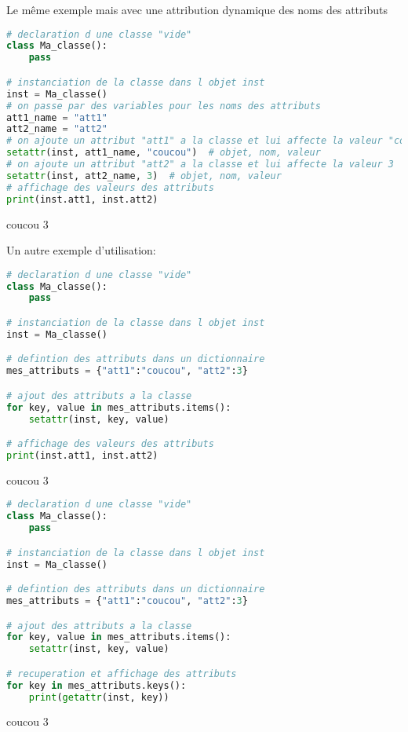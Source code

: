 Le même exemple mais avec une attribution dynamique des noms des attributs
\begin{lstlisting}[language=Python]
# declaration d une classe "vide"
class Ma_classe():
    pass

# instanciation de la classe dans l objet inst
inst = Ma_classe()
# on passe par des variables pour les noms des attributs
att1_name = "att1"
att2_name = "att2"
# on ajoute un attribut "att1" a la classe et lui affecte la valeur "coucou"
setattr(inst, att1_name, "coucou")  # objet, nom, valeur
# on ajoute un attribut "att2" a la classe et lui affecte la valeur 3
setattr(inst, att2_name, 3)  # objet, nom, valeur
# affichage des valeurs des attributs
print(inst.att1, inst.att2)
\end{lstlisting}
\begin{terminal}
coucou 3
\end{terminal}

Un autre exemple d'utilisation:
\begin{lstlisting}[language=Python]
# declaration d une classe "vide"
class Ma_classe():
    pass

# instanciation de la classe dans l objet inst
inst = Ma_classe()

# defintion des attributs dans un dictionnaire
mes_attributs = {"att1":"coucou", "att2":3}

# ajout des attributs a la classe
for key, value in mes_attributs.items():
    setattr(inst, key, value)

# affichage des valeurs des attributs
print(inst.att1, inst.att2)
\end{lstlisting}
\begin{terminal}
coucou 3
\end{terminal}

\begin{lstlisting}[language=Python]
# declaration d une classe "vide"
class Ma_classe():
    pass

# instanciation de la classe dans l objet inst
inst = Ma_classe()

# defintion des attributs dans un dictionnaire
mes_attributs = {"att1":"coucou", "att2":3}

# ajout des attributs a la classe
for key, value in mes_attributs.items():
    setattr(inst, key, value)

# recuperation et affichage des attributs
for key in mes_attributs.keys():
    print(getattr(inst, key))
\end{lstlisting}
\begin{terminal}
coucou
3
\end{terminal}
